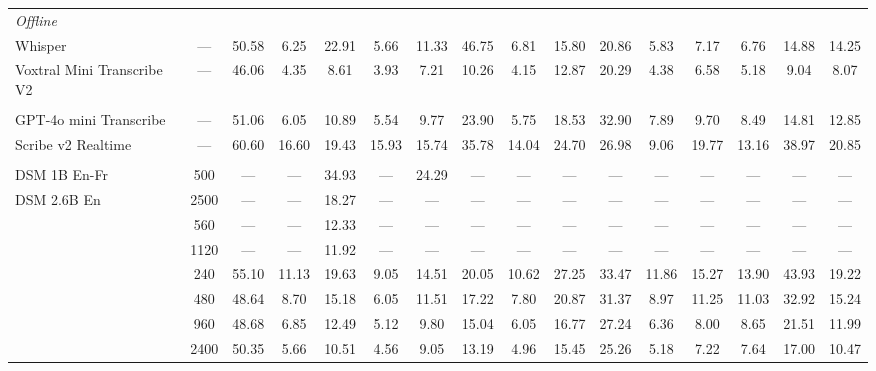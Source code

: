 \begin{landscape}
\begin{table}[h]
\begin{tabular}{lccccccccccccccc}
\multicolumn{16}{l}{\textit{Offline}} \\
\cmidrule(lr){1-16}
Whisper & — & 50.58 & 6.25 & 22.91 & 5.66 & 11.33 & 46.75 & 6.81 & 15.80 & 20.86 & 5.83 & 7.17 & 6.76 & 14.88 & 14.25 \\
Voxtral Mini Transcribe V2 & — & 46.06 & 4.35 & 8.61 & 3.93 & 7.21 & 10.26 & 4.15 & 12.87 & 20.29 & 4.38 & 6.58 & 5.18 & 9.04 & 8.07 \\

\addlinespace[0.6em]
\multicolumn{16}{l}{\textit{Realtime API}} \\
\cmidrule(lr){1-16}
GPT-4o mini Transcribe & — & 51.06 & 6.05 & 10.89 & 5.54 & 9.77 & 23.90 & 5.75 & 18.53 & 32.90 & 7.89 & 9.70 & 8.49 & 14.81 & 12.85 \\
Scribe v2 Realtime & — & 60.60 & 16.60 & 19.43 & 15.93 & 15.74 & 35.78 & 14.04 & 24.70 & 26.98 & 9.06 & 19.77 & 13.16 & 38.97 & 20.85 \\

\addlinespace[0.6em]
\multicolumn{16}{l}{\textit{Realtime Open-Source}} \\
\cmidrule(lr){1-16}
DSM 1B En-Fr & 500 & — & — & 34.93 & — & 24.29 & — & — & — & — & — & — & — & — & — \\
DSM 2.6B En & 2500 & — & — & 18.27 & — & — & — & — & — & — & — & — & — & — & — \\
\addlinespace
\multirow[t]{2}{*}{Nemotron Streaming} & 560 & — & — & 12.33 & — & — & — & — & — & — & — & — & — & — & — \\
 & 1120 & — & — & 11.92 & — & — & — & — & — & — & — & — & — & — & — \\
\addlinespace
\multirow[t]{4}{*}{Voxtral Realtime} & 240 & 55.10 & 11.13 & 19.63 & 9.05 & 14.51 & 20.05 & 10.62 & 27.25 & 33.47 & 11.86 & 15.27 & 13.90 & 43.93 & 19.22 \\
 & 480 & 48.64 & 8.70 & 15.18 & 6.05 & 11.51 & 17.22 & 7.80 & 20.87 & 31.37 & 8.97 & 11.25 & 11.03 & 32.92 & 15.24 \\
 & 960 & 48.68 & 6.85 & 12.49 & 5.12 & 9.80 & 15.04 & 6.05 & 16.77 & 27.24 & 6.36 & 8.00 & 8.65 & 21.51 & 11.99 \\
 & 2400 & 50.35 & 5.66 & 10.51 & 4.56 & 9.05 & 13.19 & 4.96 & 15.45 & 25.26 & 5.18 & 7.22 & 7.64 & 17.00 & 10.47 \\
\bottomrule
\end{tabular}
\end{table}


\end{landscape}

